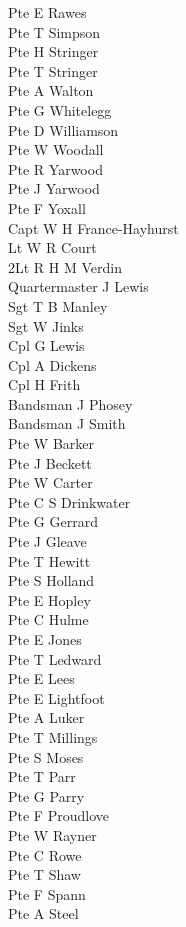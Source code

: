 \begin{multicols}{2}
  Pte E Rawes \\
  Pte T Simpson \\
  Pte H Stringer \\
  Pte T Stringer \\
  Pte A Walton \\
  Pte G Whitelegg \\
  Pte D Williamson \\
  Pte W Woodall \\
  Pte R Yarwood \\
  Pte J Yarwood \\
  Pte F Yoxall \\
  Capt W H France-Hayhurst \\
  Lt W R Court \\
  2Lt R H M Verdin \\
  Quartermaster J Lewis \\
  Sgt T B Manley \\
  Sgt W Jinks \\
  Cpl G Lewis \\
  Cpl A Dickens \\
  Cpl H Frith \\
  Bandsman J Phosey \\
  Bandsman J Smith \\
  Pte W Barker \\
  Pte J Beckett \\
  Pte W Carter \\
  Pte C S Drinkwater \\
  Pte G Gerrard \\
  Pte J Gleave \\
  Pte T Hewitt \\
  Pte S Holland \\
  Pte E Hopley \\
  Pte C Hulme \\
  Pte E Jones \\
  Pte T Ledward \\
  Pte E Lees \\
  Pte E Lightfoot \\
  Pte A Luker \\
  Pte T Millings \\
  Pte S Moses \\
  Pte T Parr \\
  Pte G Parry \\
  Pte F Proudlove \\
  Pte W Rayner \\
  Pte C Rowe \\
  Pte T Shaw \\
  Pte F Spann \\
  Pte A Steel \\
\end{multicols}

